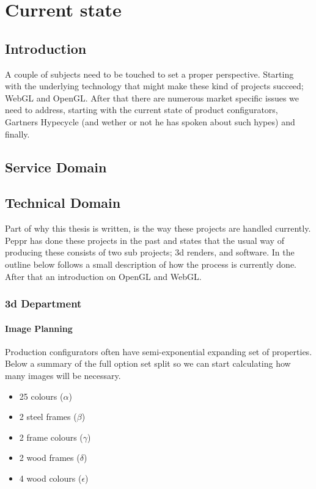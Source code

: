 \newpage
\chapter{Current state}
\section{Introduction}

A couple of subjects need to be touched to set a proper perspective. Starting with the underlying technology that might make these kind of projects succeed; WebGL and OpenGL. After that there are numerous market specific issues we need to address, starting with the current state of product configurators, Gartners Hypecycle (and wether or not he has spoken about such hypes) and finally.

\section{Service Domain}

\section{Technical Domain}
Part of why this thesis is written, is the way these projects are handled currently. Peppr has done these projects in the past and states that the usual way of producing these consists of two sub projects; 3d renders, and software. In the outline below follows a small description of how the process is currently done. After that an introduction on OpenGL and WebGL.
\newline
{}

\subsection{3d Department}
\subsubsection{Image Planning}
Production configurators often have semi-exponential expanding set of properties. Below a summary of the full option set split so we can start calculating how many images will be necessary.
\begin{itemize}
	\item 25 colours (\( \alpha \))
	\item 2 steel frames (\( \beta \))
	\item 2 frame colours (\( \gamma \))
	\item 2 wood frames (\( \delta \))
	\item 4 wood colours (\( \epsilon \))
\end{itemize}

